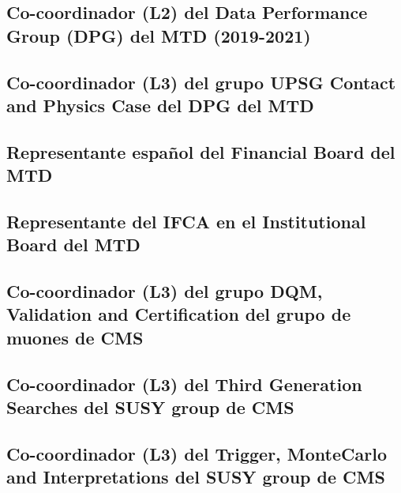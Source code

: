 \documentclass[a4paper, 11pt, twoside, openright]{report}
\begin{document}
\subsection{Co-coordinador (L2) del Data Performance Group (DPG) del MTD (2019-2021)}


\subsection{Co-coordinador (L3) del grupo UPSG Contact and Physics Case del DPG del MTD}


\subsection{Representante español del Financial Board del MTD}


\subsection{Representante del IFCA en el Institutional Board del MTD}


\subsection{Co-coordinador (L3) del grupo DQM, Validation and Certification del grupo de muones de CMS}


\subsection{Co-coordinador (L3) del Third Generation Searches del SUSY group de CMS}


\subsection{Co-coordinador (L3) del Trigger, MonteCarlo and Interpretations del SUSY group de CMS}

\end{document}
